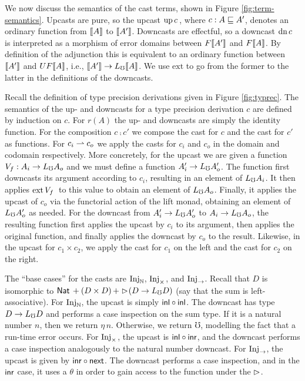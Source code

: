 We now discuss the semantics of the cast terms, shown in Figure
\ref{fig:term-semantics}. Upcasts are pure, so the upcast ${\text{up}\,{c}\,}$, where $c :
A \sqsubseteq A'$, denotes an ordinary function from $\llbracket {A} \rrbracket$ to $\llbracket {A'} \rrbracket$.
Downcasts are effectful, so a downcast ${\text{dn}\,{c}\,}$ is interpreted as a morphism
of error domains between $F\llbracket {A'} \rrbracket$ and $F\llbracket {A} \rrbracket$. By definition of the
adjunction this is equivalent to an ordinary function between $\llbracket {A'} \rrbracket$ and
$UF\llbracket {A} \rrbracket$, i.e., $\llbracket {A'} \rrbracket \to L_\mho \llbracket {A} \rrbracket$. We use $\text{ext}$ to go from
the former to the latter in the definitions of the downcasts.



Recall the definition of type precision derivations given in Figure
\ref{fig:typrec}. The semantics of the up- and downcasts for a type precision
derivation $c$ are defined by induction on $c$.
%
For $r(A)$ the up- and downcasts are simply the identity function. 
%
For the composition $c \comp c'$ we compose the cast for $c$ and the cast for
$c'$ as functions.
%
For $c_i \rightharpoonup c_o$ we apply the casts for $c_i$ and $c_o$ in the domain and
codomain respectively. More concretely, for the upcast we are given a function
$V_f : A_i \to L_\mho A_o$ and we must define a function $A_i' \to L_\mho A_o'$. The
function first downcasts its argument according to $c_i$, resulting in an
element of $L_\mho A_i$. It then applies $\text{ext}\,{V_f}\,{}$ to this value to obtain an
element of $L_\mho A_o$. Finally, it applies the upcast of $c_o$ via the functorial
action of the lift monad, obtaining an element of $L_\mho A_o'$ as needed. For the
downcast from $A_i' \to L_\mho A_o'$ to $A_i \to L_\mho A_o$, the resulting function
first applies the upcast by $c_i$ to its argument, then applies the original
function, and finally applies the downcast by $c_o$ to the result.
%
Likewise, in the upcast for $c_1 \times c_2$, we apply the cast for $c_1$ on the
left and the cast for $c_2$ on the right.

The ``base cases'' for the casts are $\text{Inj}_\mathbb{N}$, $\text{Inj}_\times$, and $\text{Inj}_\to$. Recall
that $D$ is isomorphic to $\mathsf{Nat}\, + (D \times D)\, + \vartriangleright \hspace{-0.2em} (D \to L_\mho D)$
(say that the sum is left-associative).
%
For $\text{Inj}_\mathbb{N}$, the upcast is simply $\mathsf{inl} \circ \mathsf{inl}$. The downcast has type $D
\to L_\mho D$ and performs a case inspection on the sum type. If it is a natural
number $n$, then we return $\eta\, n$. Otherwise, we return $\mho$, modelling
the fact that a run-time error occurs.
%
For $\text{Inj}_\times$, the upcast is $\mathsf{inl} \circ \mathsf{inr}$, and the downcast performs a case
inspection analogously to the natural number downcast.
%
For $\text{Inj}_\to$, the upcast is given by $\mathsf{inr} \circ \mathsf{next}$. The downcast performs a
case inspection, and in the $\mathsf{inr}$ case, it uses a $\theta$ in order to gain
access to the function under the $\vartriangleright$.


